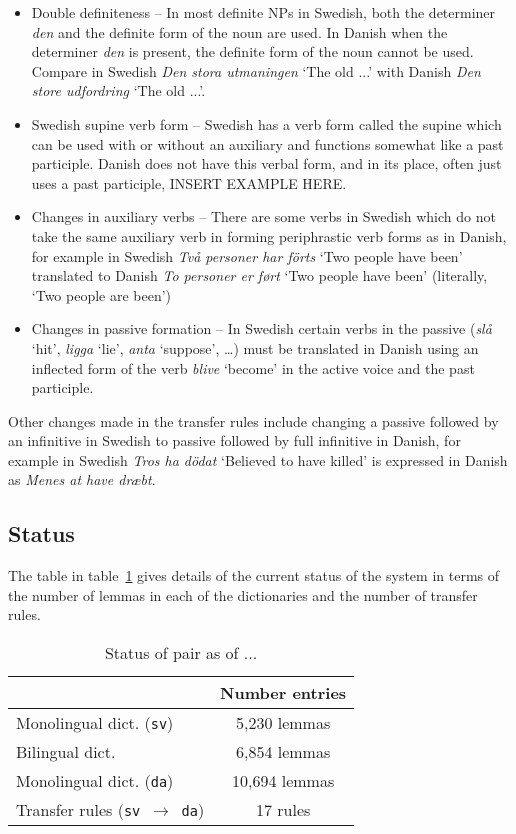 \documentclass[11pt]{article}
\begin{document}
\begin{itemize}
  \item  Double definiteness -- In most definite NPs in Swedish, both the determiner \emph{den}
    and the definite form of the noun are used. In Danish when the determiner \emph{den} is 
    present, the definite form of the noun cannot be used. Compare in Swedish \emph{Den stora utmaningen}
    `The old ...' with Danish \emph{Den store udfordring} `The old ...'.
  \item  Swedish supine verb form -- Swedish has a verb form called the supine which can be used with
    or without an auxiliary and functions somewhat like a past participle. Danish does not have this 
    verbal form, and in its place, often just uses a past participle, INSERT EXAMPLE HERE.
  \item  Changes in auxiliary verbs -- There are some verbs in Swedish which do not take the same 
    auxiliary verb in forming periphrastic verb forms as in Danish, for example in Swedish \emph{Två 
    personer har förts} `Two people have been' translated to Danish \emph{To personer er ført} `Two people 
    have been' (literally, `Two people are been') 
  \item  Changes in passive formation -- In Swedish certain verbs in the passive (\emph{slå} `hit', 
    \emph{ligga} `lie', \emph{anta} `suppose', \ldots) must be translated in Danish using an inflected 
    form of the verb \emph{blive} `become' in the active voice and the past participle.
\end{itemize}

Other changes made in the transfer rules include changing a passive followed by an infinitive in Swedish
to passive followed by full infinitive in Danish, for example in Swedish \emph{Tros ha dödat} `Believed to have
killed' is expressed in Danish as \emph{Menes at have dræbt}.

\subsection{Status}

The table in table~\ref{table:status} gives details of the current status of the system
in terms of the number of lemmas in each of the dictionaries and the number of transfer rules.

\begin{table}
\centering
\begin{tabular}{|l|c|}
\hline
                                           & Number entries\\
\hline
Monolingual dict. ({\tt sv})               & 5,230 lemmas \\
Bilingual dict.                            & 6,854 lemmas \\
Monolingual dict. ({\tt da})               & 10,694 lemmas \\
Transfer rules ({\tt sv $\rightarrow$ da}) & 17 rules \\
\hline
\end{tabular}
    \caption{Status of pair as of ...}
    \label{table:status}
\end{table}
\end{document}
